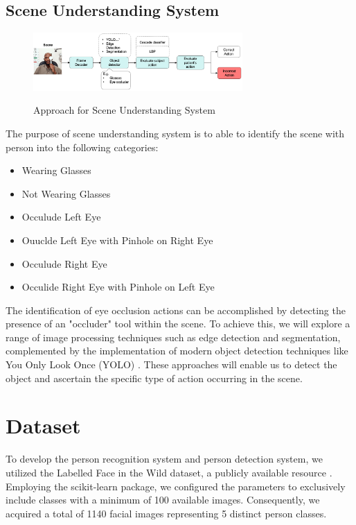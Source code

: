 \documentclass{article}
\begin{document}
\subsection{Scene Understanding System}
\begin{figure}[tbh]
    \begin{center}
        \includegraphics[width=8cm]{scene-understanding-2.png}\
        \caption{Approach for Scene Understanding System\label{figure2}} 
    \end{center}
\end{figure}
The purpose of scene understanding system is to able to identify the scene with person into the following categories:
\begin{itemize}
    \item Wearing Glasses
    \item Not Wearing Glasses
    \item Occulude Left Eye
    \item Ouuclde Left Eye with Pinhole on Right Eye
    \item Occulude Right Eye
    \item Occulide Right Eye with Pinhole on Left Eye
\end{itemize}
The identification of eye occlusion actions can be accomplished by detecting the presence of an "occluder" tool within the scene. To achieve this, we will explore a range of image processing techniques such as edge detection and segmentation, complemented by the implementation of modern object detection techniques like You Only Look Once (YOLO) \cite{redmon2016yolo}. These approaches will enable us to detect the object and ascertain the specific type of action occurring in the scene.

\section{Dataset}
To develop the person recognition system and person detection system, we utilized the Labelled Face in the Wild dataset, a publicly available resource \cite{lfwTech}. Employing the scikit-learn package, we configured the parameters to exclusively include classes with a minimum of 100 available images. Consequently, we acquired a total of 1140 facial images representing 5 distinct person classes.
\end{document}
